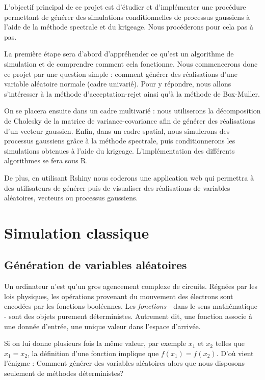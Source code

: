 \documentclass[10pt]{article} %
\begin{document}
L’objectif principal de ce projet est d’étudier et d’implémenter une procédure permettant de générer des simulations conditionnelles de processus gaussiens à l’aide de la méthode spectrale et du krigeage. Nous procéderons pour cela pas à pas.

La première étape sera d’abord d’appréhender ce qu’est un algorithme de simulation et de comprendre comment cela fonctionne. Nous commencerons donc ce projet par une question simple : comment générer des réalisations d’une variable aléatoire normale (cadre univarié). Pour y répondre, nous allons s’intéresser à la méthode d’acceptation-rejet ainsi qu’à la méthode de Box-Muller.

On se placera ensuite dans un cadre multivarié : nous utiliserons la décomposition de Cholesky de la matrice de variance-covariance afin de générer des réalisations d’un vecteur gaussien. Enfin, dans un cadre spatial, nous simulerons des processus gaussiens grâce à la méthode spectrale, puis conditionnerons les simulations obtenues à l’aide du krigeage. L’implémentation des différents algorithmes se fera sous R.

De plus, en utilisant Rshiny nous coderons une application web qui permettra à des utilisateurs de générer puis de visualiser des réalisations de variables aléatoires, vecteurs ou processus gaussiens.


\section{Simulation classique}
\subsection{Génération de variables aléatoires}


Un ordinateur n'est qu'un gros agencement complexe de circuits. Régnées par les lois physiques, les opérations provenant du mouvement des électrons
sont encodées par les fonctions booléennes. Les \textit{fonctions} - dans le sens mathématique - sont des objets purement déterministes. Autrement dit,
une fonction associe à une donnée d'entrée, une unique valeur dans l'espace d'arrivée.

Si on lui donne plusieurs fois la même valeur, par exemple $x_1$ et $x_2$
telles que $x_1 = x_2$, la définition d'une fonction implique que $f(x_1) = f(x_2)$. D'où vient l'énigme : Comment générer des variables aléatoires alors que nous
disposons seulement de méthodes déterministes?
\end{document}
